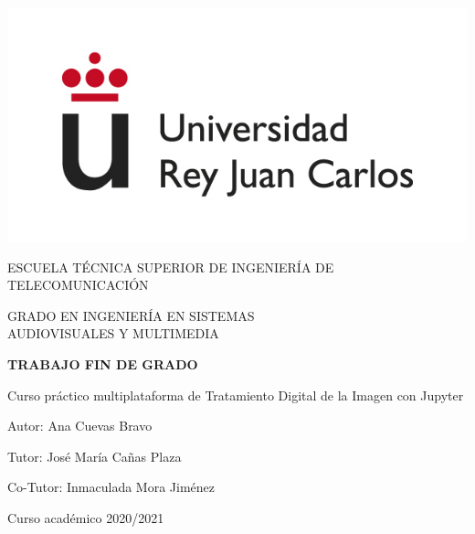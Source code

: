 \begin{titlepage}
	\begin{center}
		\vspace*{3mm}
		\begin{center}
			\includegraphics[width=0.4\linewidth]{imagenes/logo.jpg}
		\end{center}
		\vspace{6.0mm}
		
		\fontsize{15.5}{14}\selectfont ESCUELA TÉCNICA SUPERIOR DE INGENIERÍA DE TELECOMUNICACIÓN
		\vspace{13mm}
		
		\fontsize{14}{14}\selectfont GRADO EN INGENIERÍA EN SISTEMAS \\ AUDIOVISUALES Y MULTIMEDIA
		
		\vspace{70pt}
		
		\fontsize{15.7}{14}\selectfont \textbf{TRABAJO FIN DE GRADO} 
		
		\vspace{20mm}
		\begin{huge}
			Curso práctico multiplataforma de Tratamiento Digital de la Imagen con Jupyter
		\end{huge}
		
		\vspace{20mm}
		
		\begin{large}
			Autor: Ana Cuevas Bravo
			
			Tutor: José María Cañas Plaza
			
			Co-Tutor: Inmaculada Mora Jiménez
			
			\vspace{10mm}
		\end{large}
		\begin{normalsize}
			Curso académico 2020/2021		
		\end{normalsize}
		\vspace{10mm}
		
	\end{center}
	
\end{titlepage}